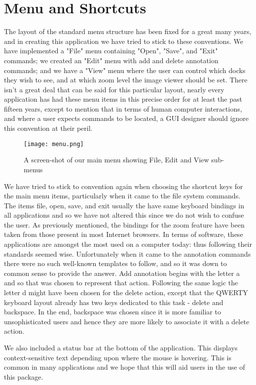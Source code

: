 \section{Menu and Shortcuts}
The layout of the standard menu structure has been fixed for a great many years, and in creating this application we have tried to stick to these conventions.  We have implemented a "File" menu containing "Open", "Save", and "Exit" commands; we created an "Edit"  menu with add and delete annotation commands; and we have a "View" menu where the user can control which docks they wish to see, and at which zoom level the image viewer should be set.  There isn’t a great deal that can be said for this particular layout, nearly every application has had these menu items in this precise order for at least the past fifteen years, except to mention that in terms of human computer interactions, and where a user expects commands to be located, a GUI designer should ignore this convention at their peril.

\begin{figure}[h]
\centering
\texttt{[image: menu.png]}
\caption{A screen-shot of our main menu showing File, Edit and View sub-menus}
\label{fig:fullView}
\end{figure}

We have tried to stick to convention again when choosing the shortcut keys for the main menu items, particularly when it came to the file system commands.  The items file, open, save, and exit usually the have same keyboard bindings in all applications and so we have not altered this since we do not wish to confuse the user.  As previously mentioned, the bindings for the zoom feature have been taken from those present in most Internet browsers.  In terms of software, these applications are amongst the most used on a computer today: thus following their standards seemed wise.  Unfortunately when it came to the annotation commands there were no such well-known templates to follow, and so it was down to common sense to provide the answer.  Add annotation begins with the letter a and so that was chosen to represent that action.  Following the same logic the letter d might have been chosen for the delete action, except that the QWERTY keyboard layout already has two keys dedicated to this task - delete and backspace.  In the end, backspace was chosen since it is more familiar to unsophisticated users and hence they are more likely to associate it with a delete action.

We also included a status bar at the bottom of the application.  This displays context-sensitive text depending upon where the mouse is hovering.  This is common in many applications and we hope that this will aid users in the use of this package.
